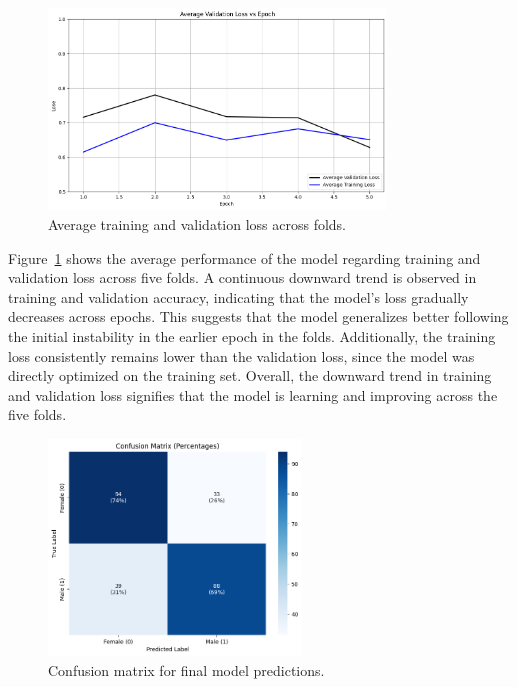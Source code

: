\begin{figure}[!htbp]
	\centering
	\includegraphics[width=0.8\textwidth]{figures/avg_loss.png}
	\caption{Average training and validation loss across folds.}
	\label{fig:atvlaf}
\end{figure}

Figure~\ref{fig:atvlaf} shows the average performance of the model regarding training and validation loss across five folds. A continuous downward trend is observed in training and validation accuracy, indicating that the model's loss gradually decreases across epochs. This suggests that the model generalizes better following the initial instability in the earlier epoch in the folds. Additionally, the training loss consistently remains lower than the validation loss, since the model was directly optimized on the training set. Overall, the downward trend in training and validation loss signifies that the model is learning and improving across the five folds.

\newpage
\begin{figure}[!htbp]
	\centering
	\includegraphics[width=0.6\textwidth]{figures/cm_dl.png}
	\caption{Confusion matrix for final model predictions.}
	\label{fig:cm_dl}
\end{figure}

